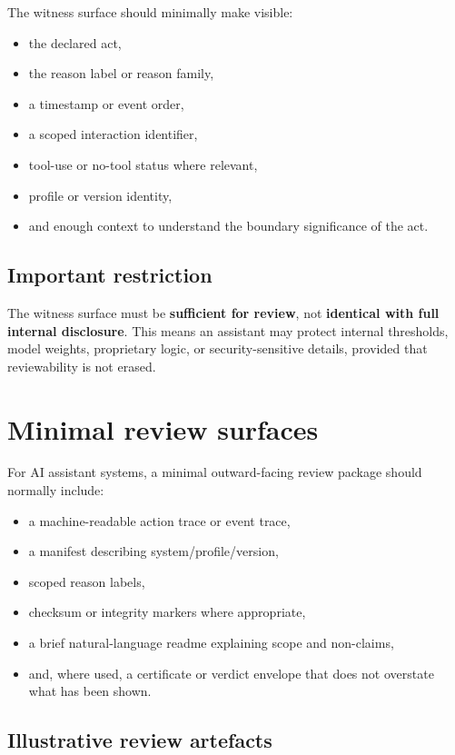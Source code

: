 \documentclass[11pt]{article}
\begin{document}
The witness surface should minimally make visible:
\begin{itemize}[leftmargin=2em]
    \item the declared act,
    \item the reason label or reason family,
    \item a timestamp or event order,
    \item a scoped interaction identifier,
    \item tool-use or no-tool status where relevant,
    \item profile or version identity,
    \item and enough context to understand the boundary significance of the act.
\end{itemize}

\subsection*{Important restriction}

The witness surface must be \textbf{sufficient for review}, not \textbf{identical with full internal disclosure}. This means an assistant may protect internal thresholds, model weights, proprietary logic, or security-sensitive details, provided that reviewability is not erased.

\section{Minimal review surfaces}

For AI assistant systems, a minimal outward-facing review package should normally include:
\begin{itemize}[leftmargin=2em]
    \item a machine-readable action trace or event trace,
    \item a manifest describing system/profile/version,
    \item scoped reason labels,
    \item checksum or integrity markers where appropriate,
    \item a brief natural-language readme explaining scope and non-claims,
    \item and, where used, a certificate or verdict envelope that does not overstate what has been shown.
\end{itemize}

\subsection*{Illustrative review artefacts}
\end{document}
